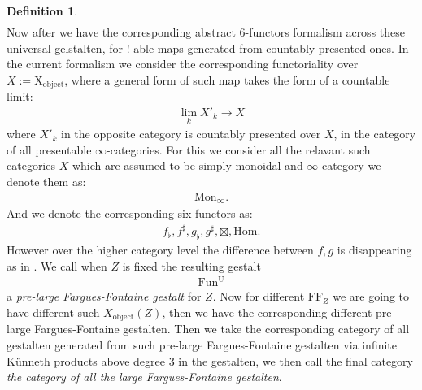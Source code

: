 \documentclass[12pt]{article}
\theoremstyle{definition}
\newtheorem{definition}{Definition}
\begin{document}
\begin{definition}
\begin{align}
\end{align}
Now after \cite{5S5} we have the corresponding abstract 6-functors formalism across these universal gelstalten, for $!$-able maps generated from countably presented ones. In the current formalism we consider the corresponding functoriality over $X:=\mathrm{X}_\mathrm{object}$, where a general form of such map takes the form of a countable limit:
\begin{align}
\lim_k X'_k \rightarrow X
\end{align}
where $X'_k$ in the opposite category is countably presented over $X$, in the category of all presentable $\infty$-categories. For this we consider all the relavant such categories $X$ which are assumed to be simply monoidal and $\infty$-category we denote them as:
\begin{align}
\mathrm{Mon}_\infty.
\end{align}
And we denote the corresponding six functors as:
\begin{align}
f_\flat, f^\sharp, g_\flat, g^\sharp, \boxtimes, \mathrm{Hom}.  
\end{align}
However over the higher category level the difference between $f,g$ is disappearing as in \cite{5S5}. We call when $Z$ is fixed the resulting gestalt
\begin{align}
\mathrm{Fun^U}
\end{align}
a \textit{pre-large Fargues-Fontaine gestalt} for $Z$. Now for different $\mathrm{FF}_Z$ we are going to have different such $X_\mathrm{object}(Z)$, then we have the corresponding different pre-large Fargues-Fontaine gestalten. Then we take the corresponding category of all gestalten generated from such pre-large Fargues-Fontaine gestalten via infinite K\"unneth products above degree 3 in the gestalten, we then call the final category \textit{the category of all the large Fargues-Fontaine gestalten}. 
\end{definition}
\end{document}
